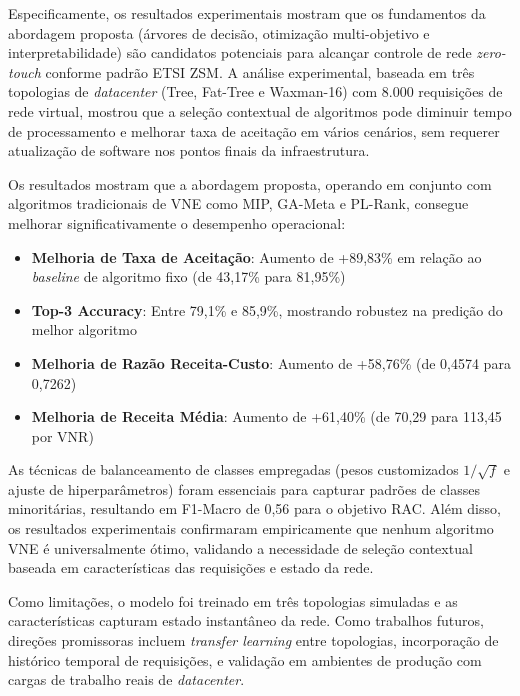 \documentclass[conference]{IEEEtran}
\begin{document}
Especificamente, os resultados experimentais mostram que os fundamentos da abordagem proposta (árvores de decisão, otimização multi-objetivo e interpretabilidade) são candidatos potenciais para alcançar controle de rede \textit{zero-touch} conforme padrão ETSI ZSM.
A análise experimental, baseada em três topologias de \textit{datacenter} (Tree, Fat-Tree e Waxman-16) com 8.000 requisições de rede virtual, mostrou que a seleção contextual de algoritmos pode diminuir tempo de processamento e melhorar taxa de aceitação em vários cenários, sem requerer atualização de software nos pontos finais da infraestrutura.

Os resultados mostram que a abordagem proposta, operando em conjunto com algoritmos tradicionais de VNE como MIP, GA-Meta e PL-Rank, consegue melhorar significativamente o desempenho operacional:
\begin{itemize}
    \item \textbf{Melhoria de Taxa de Aceitação}: Aumento de +89,83\% em relação ao \textit{baseline} de algoritmo fixo (de 43,17\% para 81,95\%)
    \item \textbf{Top-3 Accuracy}: Entre 79,1\% e 85,9\%, mostrando robustez na predição do melhor algoritmo
    \item \textbf{Melhoria de Razão Receita-Custo}: Aumento de +58,76\% (de 0,4574 para 0,7262)
    \item \textbf{Melhoria de Receita Média}: Aumento de +61,40\% (de 70,29 para 113,45 por VNR)
\end{itemize}

As técnicas de balanceamento de classes empregadas (pesos customizados $1/\sqrt{f}$ e ajuste de hiperparâmetros) foram essenciais para capturar padrões de classes minoritárias, resultando em F1-Macro de 0,56 para o objetivo RAC.
Além disso, os resultados experimentais confirmaram empiricamente que nenhum algoritmo VNE é universalmente ótimo, validando a necessidade de seleção contextual baseada em características das requisições e estado da rede.

Como limitações, o modelo foi treinado em três topologias simuladas e as características capturam estado instantâneo da rede.
Como trabalhos futuros, direções promissoras incluem \textit{transfer learning} entre topologias, incorporação de histórico temporal de requisições, e validação em ambientes de produção com cargas de trabalho reais de \textit{datacenter}.




\end{document}
